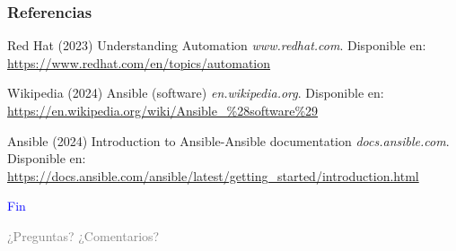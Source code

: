 \documentclass[
	11pt, %
]{beamer}
\begin{document}
\begin{frame} %
	\frametitle{Referencias}
	
	\begin{thebibliography}{99} %
		\footnotesize %
		
                Red Hat (2023)
                \newblock Understanding Automation
                \newblock \emph{www.redhat.com}. Disponible en: \url{https://www.redhat.com/en/topics/automation}
   
                Wikipedia (2024)
                \newblock Ansible (software)
                \newblock \emph{en.wikipedia.org}. Disponible en: \url{https://en.wikipedia.org/wiki/Ansible\_\%28software\%29}
            
                Ansible (2024)
                \newblock Introduction to Ansible-Ansible documentation
                \newblock \emph{docs.ansible.com}. Disponible en: \url{https://docs.ansible.com/ansible/latest/getting_started/introduction.html}

	\end{thebibliography}
\end{frame}


\begin{frame}[plain]
	\begin{center}
		{\Huge \textcolor{blue}{Fin}}
		
		\bigskip\bigskip
		
		{\LARGE \textcolor{gray}{¿Preguntas? ¿Comentarios?}}
	\end{center}
\end{frame}

\end{document}
